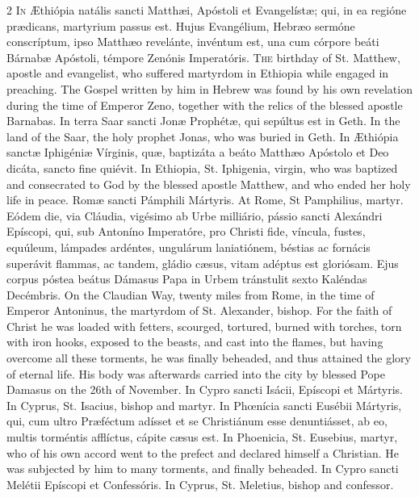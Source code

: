 \begin{paracol}{2}
\lettrine[lines=2]{I}{n} Æthiópia natális 
 sancti Matthæi, Apóstoli et Evangelístæ; qui, in ea regióne prædicans, 
 martyrium passus est. Hujus Evangélium, Hebræo sermóne conscríptum, 
 ipso Matthæo revelánte, invéntum est, una cum córpore beáti Bárnabæ Apóstoli, 
 témpore Zenónis Imperatóris.
\switchcolumn
{}
\lettrine[lines=2]{T}{he} birthday of St. Matthew, apostle 
 and evangelist, who suffered martyrdom in Ethiopia while engaged in 
 preaching. The Gospel written by him in Hebrew was found by his own 
 revelation during the time of Emperor Zeno, together with the relics of the 
 blessed apostle Barnabas.
\switchcolumn*
{}
In terra Saar sancti 
 Jonæ Prophétæ, qui sepúltus est in Geth.
\switchcolumn
{}
In the land of the Saar, the holy 
 prophet Jonas, who was buried in Geth.
\switchcolumn*
{}
In Æthiópia sanctæ 
 Iphigéniæ Vírginis, quæ, baptizáta a beáto Matthæo Apóstolo et Deo dicáta, 
 sancto fine quiévit.
\switchcolumn
{}
In Ethiopia, St. Iphigenia, virgin, 
 who was baptized and consecrated to God by the blessed apostle Matthew, and 
 who ended her holy life in peace.
\switchcolumn*
{}
Romæ sancti Pámphili 
 Mártyris.
\switchcolumn
{}
At Rome, St Pamphilius, martyr.
\switchcolumn*
{}
Eódem die, via Cláudia, vigésimo ab Urbe milliário, pássio sancti Alexándri Epíscopi, qui, sub 
 Antoníno Imperatóre, pro Christi fide, víncula, fustes, equúleum, lámpades 
 ardéntes, ungulárum laniatiónem, béstias ac fornácis superávit flammas, ac 
 tandem, gládio cæsus, vitam adéptus est gloriósam. Ejus corpus póstea 
 beátus Dámasus Papa in Urbem tránstulit sexto Kaléndas Decémbris.
\switchcolumn
{}
On the Claudian Way, twenty miles 
 from Rome, in the time of Emperor Antoninus, the martyrdom of St. Alexander, 
 bishop. For the faith of Christ he was loaded with fetters, scourged, 
 tortured, burned with torches, torn with iron hooks, exposed to the beasts, 
 and cast into the flames, but having overcome all these torments, he was 
 finally beheaded, and thus attained the glory of eternal life. His 
 body was afterwards carried into the city by blessed Pope Damasus on the 
 26th of November.
\switchcolumn*
{}
In Cypro sancti Isácii, 
 Epíscopi et Mártyris.
\switchcolumn
{}
In Cyprus, St. Isacius, bishop and 
 martyr.
\switchcolumn*
{}
In Phœnícia sancti 
 Eusébii Mártyris, qui, cum ultro Præféctum adísset et se Christiánum esse 
 denuntiásset, ab eo, multis torméntis afflíctus, cápite cæsus est.
\switchcolumn
{}
In Phoenicia, St. Eusebius, martyr, 
 who of his own accord went to the prefect and declared himself a Christian. 
 He was subjected by him to many torments, and finally beheaded.
\switchcolumn*
{}
In Cypro sancti Melétii 
 Epíscopi et Confessóris.
\switchcolumn
{}
In Cyprus, St. Meletius, bishop and 
 confessor.
\switchcolumn*
{}
\end{paracol}


